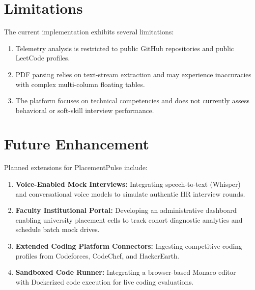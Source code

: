 \section{Limitations}
The current implementation exhibits several limitations:
\begin{enumerate}
    \item Telemetry analysis is restricted to public GitHub repositories and public LeetCode profiles.
    \item PDF parsing relies on text-stream extraction and may experience inaccuracies with complex multi-column floating tables.
    \item The platform focuses on technical competencies and does not currently assess behavioral or soft-skill interview performance.
\end{enumerate}

\section{Future Enhancement}
Planned extensions for PlacementPulse include:
\begin{enumerate}
    \item \textbf{Voice-Enabled Mock Interviews:} Integrating speech-to-text (Whisper) and conversational voice models to simulate authentic HR interview rounds.
    \item \textbf{Faculty Institutional Portal:} Developing an administrative dashboard enabling university placement cells to track cohort diagnostic analytics and schedule batch mock drives.
    \item \textbf{Extended Coding Platform Connectors:} Ingesting competitive coding profiles from Codeforces, CodeChef, and HackerEarth.
    \item \textbf{Sandboxed Code Runner:} Integrating a browser-based Monaco editor with Dockerized code execution for live coding evaluations.
\end{enumerate}
